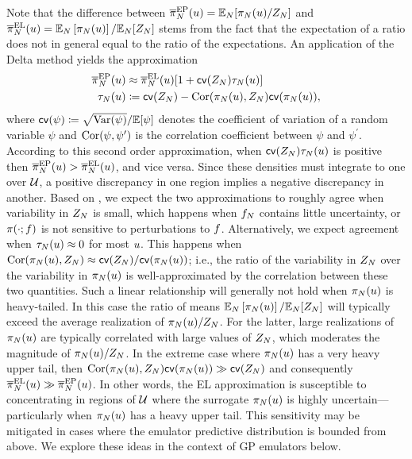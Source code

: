 \documentclass[12pt]{article}
\begin{document}
Note that the difference between $\overline{\pi}_{N}^{\mathrm{EP}}(u) = \mathbb{E}_{N}[\pi_{N}(u)/Z_{N}]$ and 
$\overline{\pi}_{N}^{\mathrm{EL}}(u) = \mathbb{E}_{N}\left[\pi_{N}(u) \right]/\mathbb{E}_{N}[Z_{N}]$ 
stems from the fact that the expectation of a ratio does not 
in general equal to the ratio of the expectations. An application of the Delta method yields the approximation
\begin{align}
\overline{\pi}_{N}^{\mathrm{EP}}(u)
&\approx \overline{\pi}_{N}^{\mathrm{EL}}(u)[1 + \mathsf{cv}(Z_{N}) \tau_{N}(u)] \label{eq:delta-method} \\
\tau_{N}(u) &\coloneqq \mathsf{cv}(Z_{N}) - \mathrm{Cor}(\pi_{N}(u), Z_{N}) \mathsf{cv}(\pi_{N}(u)), \nonumber
\end{align}
where $\mathsf{cv}(\psi) \coloneqq \sqrt{\mathrm{Var}(\psi)}/\mathbb{E}[\psi]$ denotes the coefficient of variation of a random 
variable $\psi$ and $\mathrm{Cor}(\psi, \psi^\prime)$ is the correlation coefficient between $\psi$
and $\psi^\prime$. According to this second order approximation, when 
$\mathsf{cv}(Z_{N}) \tau_{N}(u)$ is positive then $\overline{\pi}_{N}^{\mathrm{EP}}(u) > \overline{\pi}_{N}^{\mathrm{EL}}(u)$,
and vice versa. Since these densities must integrate to
one over $\mathcal{U}$, a positive discrepancy in one region implies a negative discrepancy in another.
Based on , we expect the two approximations to roughly agree when variability 
in $Z_{N}$ is small, which happens when $f_{N}$ contains little uncertainty, or 
$\pi(\cdot; f)$ is not sensitive to perturbations to $f$. Alternatively, we expect 
agreement when $\tau_{N}(u) \approx 0$ for most $u$. This happens when
$\mathrm{Cor}(\pi_{N}(u), Z_{N}) \approx \mathsf{cv}(Z_{N}) / \mathsf{cv}(\pi_{N}(u))$; i.e., the ratio of the 
variability in $Z_{N}$ over the variability in $\pi_{N}(u)$ is well-approximated by the 
correlation between these two quantities. Such a linear relationship will generally not hold when 
$\pi_{N}(u)$ is heavy-tailed. In this case the ratio of means
$\mathbb{E}_{N}\left[\pi_{N}(u) \right]/\mathbb{E}_{N}[Z_{N}]$ will typically exceed the average
realization of $\pi_{N}(u)/Z_{N}$. For the latter, large realizations of $\pi_{N}(u)$
are typically correlated with large values of $Z_{N}$, which moderates the magnitude of 
$\pi_{N}(u)/Z_{N}$. In the extreme case where $\pi_{N}(u)$ has a very heavy 
upper tail, then $\mathrm{Cor}(\pi_{N}(u), Z_{N}) \mathsf{cv}(\pi_{N}(u)) \gg \mathsf{cv}(Z_{N})$ and
consequently $\overline{\pi}_{N}^{\mathrm{EL}}(u) \gg \overline{\pi}_{N}^{\mathrm{EP}}(u)$. In other words, the 
EL approximation is susceptible to concentrating in regions of $\mathcal{U}$ where the 
surrogate $\pi_{N}(u)$ is highly uncertain---particularly when $\pi_{N}(u)$ has a 
heavy upper tail. This sensitivity may be mitigated in cases where the emulator predictive
distribution is bounded from above. We explore these ideas in the context of GP emulators 
below. 
\end{document}
